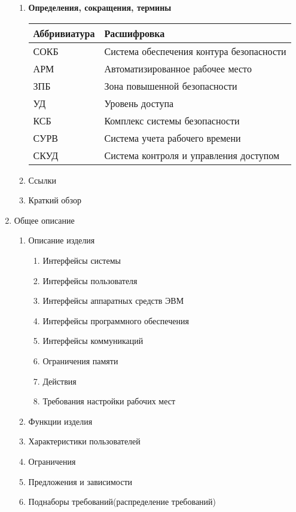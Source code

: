 \documentclass[12pt]{article} %
\begin{document}
\begin{enumerate}
\begin{enumerate}
        \item \begin{large} \textbf{Определения, сокращения, термины} \end{large} \newline
          \begin{tabular}{ | l | l |}
            \hline
            Аббривиатура & Расшифровка \\ \hline
            СОКБ & Система обеспечения контура безопасности \\
            АРМ & Автоматизированное рабочее место \\
            ЗПБ & Зона повышенной безопасности \\
            УД & Уровень доступа \\
            КСБ & Комплекс системы безопасности \\
            СУРВ & Система учета рабочего времени \\
            СКУД & Система контроля и управления доступом \\
            \hline
          \end{tabular}
        \item Ссылки
        \item Краткий обзор
    \end{enumerate} 
  \item  Общее описание
  	\begin{enumerate}
  		\item Описание изделия
  			\begin{enumerate}
  				\item Интерфейсы системы
  				\item Интерфейсы пользователя
  				\item Интерфейсы аппаратных средств ЭВМ
  				\item Интерфейсы программного обеспечения
  				\item Интерфейсы коммуникаций
  				\item Ограничения памяти
  				\item Действия
  				\item Требования настройки рабочих мест
  			\end{enumerate}
  		\item Функции изделия
  		\item Характеристики пользователей
  		\item Ограничения
  		\item Предложения и зависимости
  		\item Поднаборы требований(распределение требований)

\end{enumerate}
\end{enumerate}
\end{document}
